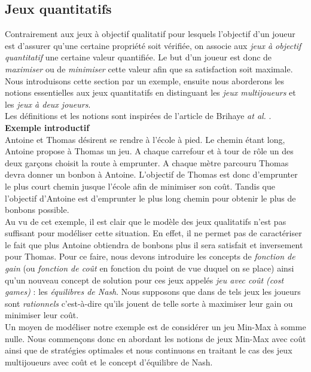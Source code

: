 
\subsection{Jeux quantitatifs }

Contrairement aux jeux à objectif qualitatif pour lesquels l'objectif d'un joueur est d'assurer qu'une certaine propriété soit vérifiée, on associe aux \textit{jeux à objectif quantitatif} une certaine valeur quantifiée. Le but d'un joueur est donc de \textit{maximiser} ou de \textit{minimiser} cette valeur afin que sa satisfaction soit maximale.\\

Nous introduisons cette section par un exemple, ensuite nous aborderons les notions essentielles aux jeux quantitatifs en distinguant les \textit{jeux multijoueurs} et les \textit{jeux à deux joueurs}.\\
Les définitions et les notions sont inspirées de l'article de Brihaye \emph{at al.} \cite{DBLP:conf/lfcs/BrihayePS13}.\\

\noindent\textbf {Exemple introductif} \\
\indent Antoine et Thomas désirent se rendre à l'école à pied. Le chemin étant long, Antoine propose à Thomas un jeu. A chaque carrefour et à tour de rôle un des deux garçons choisit la route à emprunter. A chaque mètre parcouru Thomas devra donner un bonbon à Antoine. L'objectif de Thomas est donc d'emprunter le plus court chemin jusque l'école afin de minimiser son coût. Tandis que l'objectif d'Antoine est d'emprunter le plus long chemin pour obtenir le plus de bonbons possible.\\

Au vu de cet exemple, il est clair que le modèle des jeux qualitatifs n'est pas suffisant pour modéliser cette situation. En effet, il ne permet pas de caractériser le fait que plus Antoine obtiendra de bonbons plus il sera satisfait et inversement pour Thomas. Pour ce faire, nous devons introduire les concepts de \textit{fonction de gain} (ou \textit{fonction de coût} en fonction du point de vue duquel on se place) ainsi qu'un nouveau concept de solution pour ces jeux appelés \textit{jeu avec coût (cost games)} : les \textit{équilibres de Nash}. Nous supposons que dans de tels jeux les joueurs sont \textit{rationnels} c'est-à-dire qu'ils jouent de telle sorte à maximiser leur gain ou minimiser leur coût.\\

Un moyen de modéliser notre exemple est de considérer un jeu Min-Max à somme nulle. Nous commençons donc en abordant les notions de jeux Min-Max avec coût ainsi que de stratégies optimales et nous continuons en traitant le cas des jeux multijoueurs avec coût et le concept d'équilibre de Nash.\\






